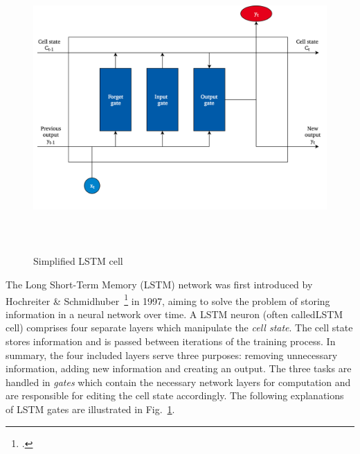 \begin{figure}[h]
  \centering
  \includegraphics[height=11cm]{img/lstm_cell}
  \caption{Simplified LSTM cell}
\label{fig:lstm_cell}
\end{figure}

The Long Short-Term Memory (LSTM) network was first introduced by Hochreiter \&
Schmidhuber~\footcite{Hochreiter1997} in 1997, aiming to solve the problem of
storing information in a neural network over time.
A LSTM neuron (often calledLSTM cell) comprises four separate layers which 
manipulate the \textit{cell state}.
The cell state stores information and is passed between iterations of the
training process.
In summary, the four included layers serve three purposes: removing unnecessary
information, adding new information and creating an output.
The three tasks are handled in \textit{gates} which contain the necessary
network layers for computation and are responsible for editing the cell state
accordingly.
The following explanations of LSTM gates are illustrated in Fig.~\ref{fig:lstm_cell}.

